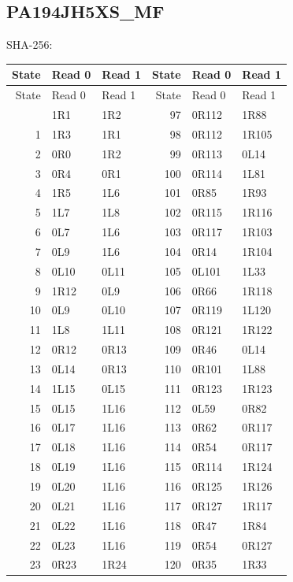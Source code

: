 \subsection{PA194JH5XS\_MF}
\noindent\footnotesize SHA-256: \par
\begingroup\small\setlength{\tabcolsep}{12pt}
\begin{longtable}{rll@{\qquad}rll}
\toprule State & Read 0 & Read 1 & State & Read 0 & Read 1\\
\midrule\endfirsthead
\toprule State & Read 0 & Read 1 & State & Read 0 & Read 1\\
\midrule\endhead
\bottomrule\endfoot
0 & 1R1 & 1R2 & 97 & 0R112 & 1R88\\
1 & 1R3 & 1R1 & 98 & 0R112 & 1R105\\
2 & 0R0 & 1R2 & 99 & 0R113 & 0L14\\
3 & 0R4 & 0R1 & 100 & 0R114 & 1L81\\
4 & 1R5 & 1L6 & 101 & 0R85 & 1R93\\
5 & 1L7 & 1L8 & 102 & 0R115 & 1R116\\
6 & 0L7 & 1L6 & 103 & 0R117 & 1R103\\
7 & 0L9 & 1L6 & 104 & 0R14 & 1R104\\
8 & 0L10 & 0L11 & 105 & 0L101 & 1L33\\
9 & 1R12 & 0L9 & 106 & 0R66 & 1R118\\
10 & 0L9 & 0L10 & 107 & 0R119 & 1L120\\
11 & 1L8 & 1L11 & 108 & 0R121 & 1R122\\
12 & 0R12 & 0R13 & 109 & 0R46 & 0L14\\
13 & 0L14 & 0R13 & 110 & 0R101 & 1L88\\
14 & 1L15 & 0L15 & 111 & 0R123 & 1R123\\
15 & 0L15 & 1L16 & 112 & 0L59 & 0R82\\
16 & 0L17 & 1L16 & 113 & 0R62 & 0R117\\
17 & 0L18 & 1L16 & 114 & 0R54 & 0R117\\
18 & 0L19 & 1L16 & 115 & 0R114 & 1R124\\
19 & 0L20 & 1L16 & 116 & 0R125 & 1R126\\
20 & 0L21 & 1L16 & 117 & 0R127 & 1R117\\
21 & 0L22 & 1L16 & 118 & 0R47 & 1R84\\
22 & 0L23 & 1L16 & 119 & 0R54 & 0R127\\
23 & 0R23 & 1R24 & 120 & 0R35 & 1R33\\

\end{longtable}
